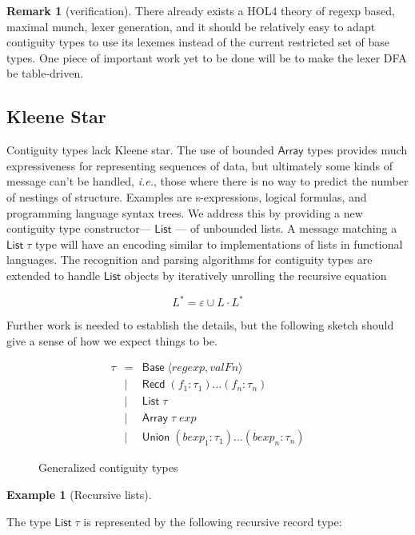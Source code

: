 \documentclass{article}
\newcommand{\ie}{\textit{i.e.}}
\newcommand{\konst}[1]{\ensuremath{\mathsf{#1}}}
\newcommand{\kstar}[1]{\ensuremath{{#1}^{*}}}
\theoremstyle{definition}
\newtheorem*{example}{Example}
\newtheorem*{remark}{Remark}
\begin{document}
\begin{remark} [verification] There already exists a
  HOL4 theory of regexp based, maximal munch, lexer generation,
  and it should be relatively easy to adapt contiguity types to use
  its lexemes instead of the current restricted set of base types. One
  piece of important work yet to be done will be to make the lexer DFA
  be table-driven.
\end{remark}

\subsection{Kleene Star}
  Contiguity types lack Kleene star. The use of bounded \konst{Array}
  types provides much expressiveness for representing sequences of
  data, but ultimately some kinds of message can't be handled, \ie,
  those where there is no way to predict the number of nestings of
  structure. Examples are s-expressions, logical formulas, and
  programming language syntax trees. We address this by providing a
  new contiguity type constructor--- \konst{List} --- of unbounded
  lists. A message matching a $\konst{List}\;\tau$ type will have an
  encoding similar to implementations of lists in functional
  languages. The recognition and parsing algorithms for contiguity
  types are extended to handle \konst{List} objects by iteratively
  unrolling the recursive equation

\[ \kstar{L} = \varepsilon \cup L \cdot \kstar{L} \]

Further work is needed to establish the details, but the following
sketch should give a sense of how we expect things to be.

\begin{figure}
\[
\begin{array}{rcl}
 \tau & =    & \konst{Base}\; \langle \mathit{regexp}, \mathit{valFn} \rangle \\
      & \mid & \konst{Recd}\; (f_1 : \tau_1) \ldots (f_n : \tau_n) \\
      & \mid & \konst{List}\; \tau \\
      & \mid & \konst{Array}\; \tau \; \mathit{exp} \\
      & \mid & \konst{Union}\; (\mathit{bexp}_1 : \tau_1) \ldots (\mathit{bexp}_n : \tau_n)
\end{array}
\]
\caption{Generalized contiguity types}
\label{gen-contig-types}
\end{figure}

\begin{example}[Recursive lists]

\end{example}
The type $\konst{List}\;\tau$ is represented by the following
recursive record type:
\end{document}
